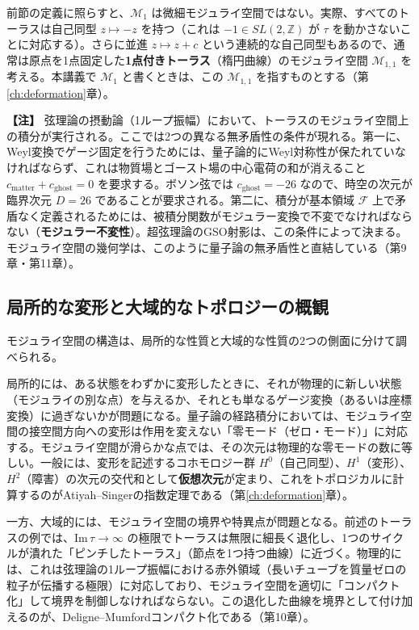 \documentclass[uplatex, dvipdfmx, book]{jsbook}
\let\origsubsection\subsection
\let\origsubsubsection\subsubsection
\renewcommand{\section}{\origsubsection}
\renewcommand{\subsection}{\origsubsubsection}
\renewcommand{\subsubsection}{\paragraph}
\newenvironment{note}{\vspace{1ex}\par\footnotesize\noindent\textbf{【注】}}{\par\vspace{1ex}}
\begin{document}
前節の定義に照らすと、$\mathcal{M}_1$ は微細モジュライ空間ではない。実際、すべてのトーラスは自己同型 $z \mapsto -z$ を持つ（これは $-1 \in SL(2, \mathbb{Z})$ が $\tau$ を動かさないことに対応する）。さらに並進 $z \mapsto z + c$ という連続的な自己同型もあるので、通常は原点を1点固定した\textbf{1点付きトーラス}（楕円曲線）のモジュライ空間 $\mathcal{M}_{1,1}$ を考える。本講義で $\mathcal{M}_1$ と書くときは、この $\mathcal{M}_{1,1}$ を指すものとする（第\ref{ch:deformation}章）。

\begin{note}
弦理論の摂動論（1ループ振幅）において、トーラスのモジュライ空間上の積分が実行される。ここでは2つの異なる無矛盾性の条件が現れる。第一に、Weyl変換でゲージ固定を行うためには、量子論的にWeyl対称性が保たれていなければならず、これは物質場とゴースト場の中心電荷の和が消えること $c_{\text{matter}} + c_{\text{ghost}} = 0$ を要求する。ボソン弦では $c_{\text{ghost}} = -26$ なので、時空の次元が臨界次元 $D = 26$ であることが要求される\cite{polchinskistringtheoryvolume12005}。第二に、積分が基本領域 $\mathcal{F}$ 上で矛盾なく定義されるためには、被積分関数がモジュラー変換で不変でなければならない（\textbf{モジュラー不変性}）。超弦理論のGSO射影は、この条件によって決まる\cite{polchinskistringtheoryvolume2005}。モジュライ空間の幾何学は、このように量子論の無矛盾性と直結している（第9章・第11章）。
\end{note}

\section{局所的な変形と大域的なトポロジーの概観}

モジュライ空間の構造は、局所的な性質と大域的な性質の2つの側面に分けて調べられる。

局所的には、ある状態をわずかに変形したときに、それが物理的に新しい状態（モジュライの別な点）を与えるか、それとも単なるゲージ変換（あるいは座標変換）に過ぎないかが問題になる。量子論の経路積分においては、モジュライ空間の接空間方向への変形は作用を変えない「零モード（ゼロ・モード）」に対応する。モジュライ空間が滑らかな点では、その次元は物理的な零モードの数に等しい。一般には、変形を記述するコホモロジー群 $H^0$（自己同型）、$H^1$（変形）、$H^2$（障害）の次元の交代和として\textbf{仮想次元}が定まり、これをトポロジカルに計算するのがAtiyah--Singerの指数定理である（第\ref{ch:deformation}章）。

一方、大域的には、モジュライ空間の境界や特異点が問題となる。前述のトーラスの例では、$\mathrm{Im}\,\tau \to \infty$ の極限でトーラスは無限に細長く退化し、1つのサイクルが潰れた「ピンチしたトーラス」（節点を1つ持つ曲線）に近づく。物理的には、これは弦理論の1ループ振幅における赤外領域（長いチューブを質量ゼロの粒子が伝播する極限）に対応しており、モジュライ空間を適切に「コンパクト化」して境界を制御しなければならない。この退化した曲線を境界として付け加えるのが、Deligne--Mumfordコンパクト化である（第10章）。
\end{document}
